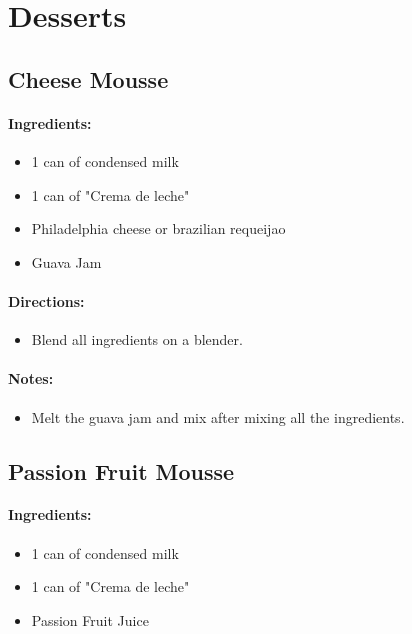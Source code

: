 \documentclass{article}
\begin{document}
\section{Desserts}


\subsection{Cheese Mousse}

\paragraph{Ingredients:}
\begin{itemize}
    \item 1 can of condensed milk
    \item 1 can of "Crema de leche"
    \item Philadelphia cheese or brazilian requeijao
    \item Guava Jam
\end{itemize}

\paragraph{Directions:}
\begin{itemize}
    \item Blend all ingredients on a blender.
\end{itemize}

\paragraph{Notes:}
\begin{itemize}
    \item Melt the guava jam and mix after mixing all the ingredients.
\end{itemize}

\subsection{Passion Fruit Mousse}

\paragraph{Ingredients:}
\begin{itemize}
    \item 1 can of condensed milk
    \item 1 can of "Crema de leche"
    \item Passion Fruit Juice
\end{itemize}
\end{document}
